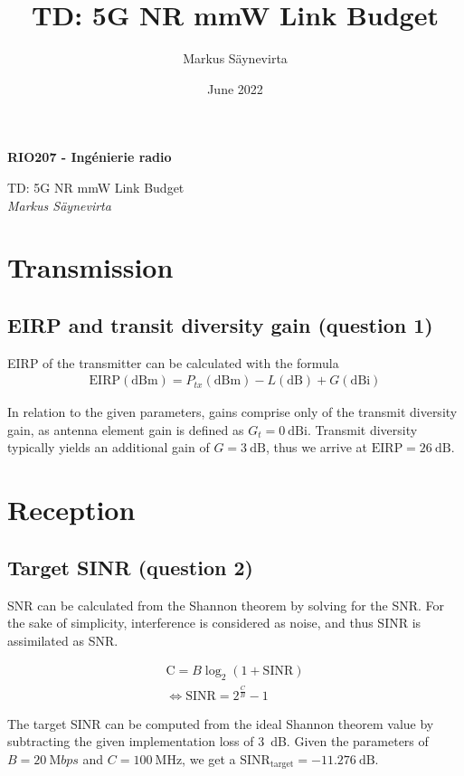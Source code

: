 \documentclass{article}
\title{TD: 5G NR mmW Link Budget}
\author{Markus Säynevirta}
\date{June 2022}
\begin{document}
\thispagestyle{plain}

\large
\textbf{RIO207 - Ingénierie radio}

\large
TD: 5G NR mmW Link Budget\\
\textit{Markus Säynevirta}
\vspace{0.5cm}

\section{Transmission}
\subsection{EIRP and transit diversity gain (question 1)}

EIRP of the transmitter can be calculated with the formula 
\begin{align*}
     \mathrm{EIRP(dBm)} = P_{tx}\mathrm{(dBm)} - L\mathrm{(dB)} + G\mathrm{(dBi)}
\end{align*}

In relation to the given parameters, gains comprise only of the transmit diversity gain, as antenna element gain is defined as \(G_t = 0\ \mathrm{dBi}\). Transmit diversity typically yields an additional gain of \(G =3\ \mathrm{dB}\), thus we arrive at \(\mathrm{EIRP} = 26\ \mathrm{dB}\).

\section{Reception}
\subsection{Target SINR (question 2)}

SNR can be calculated from the Shannon theorem by solving for the SNR. For the sake of simplicity, interference is considered as noise, and thus SINR is assimilated as SNR.

\begin{gather*}
     \mathrm{C} = B\log_2 (1+\mathrm{SINR}) \\
     \Leftrightarrow \mathrm{SINR} = 2^{\frac{C}{B}} - 1
\end{gather*}

The target SINR can be computed from the ideal Shannon theorem value by subtracting the given implementation loss of \SI{3}{dB}. Given the parameters of \(B = \SI{20}{\mega bps}\) and \(C = \SI{100}{\mega\hertz}\), we get a \(\mathrm{SINR_{target}} = \SI{-11.276}{\deci\bel}\).
\end{document}
